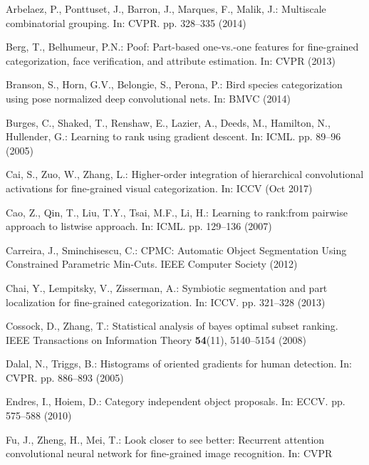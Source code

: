 \documentclass[runningheads]{llncs}
\begin{document}
\begin{thebibliography}{10}
\providecommand{\url}[1]{\texttt{#1}}
\providecommand{\urlprefix}{URL }
\providecommand{\doi}[1]{https://doi.org/#1}

Arbelaez, P., Ponttuset, J., Barron, J., Marques, F., Malik, J.: Multiscale
  combinatorial grouping. In: CVPR. pp. 328--335 (2014)

Berg, T., Belhumeur, P.N.: Poof: Part-based one-vs.-one features for
  fine-grained categorization, face verification, and attribute estimation. In:
  CVPR (2013)

Branson, S., Horn, G.V., Belongie, S., Perona, P.: Bird species categorization
  using pose normalized deep convolutional nets. In: BMVC (2014)

Burges, C., Shaked, T., Renshaw, E., Lazier, A., Deeds, M., Hamilton, N.,
  Hullender, G.: Learning to rank using gradient descent. In: ICML. pp. 89--96
  (2005)

Cai, S., Zuo, W., Zhang, L.: Higher-order integration of hierarchical
  convolutional activations for fine-grained visual categorization. In: ICCV
  (Oct 2017)

Cao, Z., Qin, T., Liu, T.Y., Tsai, M.F., Li, H.: Learning to rank:from pairwise
  approach to listwise approach. In: ICML. pp. 129--136 (2007)

Carreira, J., Sminchisescu, C.: CPMC: Automatic Object Segmentation Using
  Constrained Parametric Min-Cuts. IEEE Computer Society (2012)

Chai, Y., Lempitsky, V., Zisserman, A.: Symbiotic segmentation and part
  localization for fine-grained categorization. In: ICCV. pp. 321--328 (2013)

Cossock, D., Zhang, T.: Statistical analysis of bayes optimal subset ranking.
  IEEE Transactions on Information Theory  \textbf{54}(11),  5140--5154 (2008)

Dalal, N., Triggs, B.: Histograms of oriented gradients for human detection.
  In: CVPR. pp. 886--893 (2005)

Endres, I., Hoiem, D.: Category independent object proposals. In: ECCV. pp.
  575--588 (2010)

Fu, J., Zheng, H., Mei, T.: Look closer to see better: Recurrent attention
  convolutional neural network for fine-grained image recognition. In: CVPR


\end{thebibliography}
\end{document}
